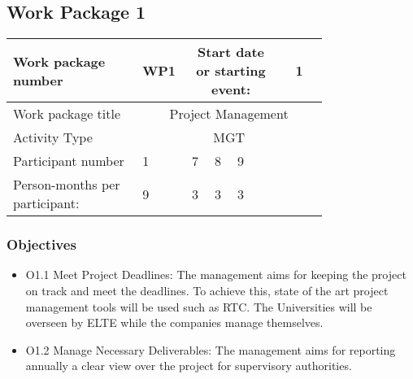 \subsection{Work Package 1}

\begin{table}[hbpt]\centering
	\begin{tabular}{|p{0.35\linewidth}|p{0.06\linewidth}|p{0.06\linewidth}|p{0.06\linewidth}|
                     p{0.06\linewidth}|p{0.06\linewidth}|p{0.06\linewidth}|p{0.06\linewidth}|}\hline
		 Work package number& WP1 &
		 \multicolumn{4}{|c|}{Start date or starting event:}{}&
		 \multicolumn{2}{|c|}{                        1  }{}\\\hline
		 Work package title&\multicolumn{7}{|c|}{ Project Management }{}\\\hline
		 Activity Type&\multicolumn{7}{|c|}{ MGT }{}\\\hline
		 Participant number & 1 & 7 & 8 & 9 & ~ & ~ & ~ \\\hline
		 Person-months per participant: & 9 & 3 & 3 & 3 & ~ & ~ & ~ \\\hline
	\end{tabular}
\end{table}

\subsubsection{Objectives}
\begin{itemize}
	\item O1.1 Meet Project Deadlines: The management aims for keeping the project on track and meet the deadlines. To achieve this, state of the art project management tools will be used such as \gls{RTC}. The Universities will be overseen by ELTE while the companies manage themselves. 
	
	\item O1.2 Manage Necessary Deliverables: The management aims for reporting annually a clear view over the project for supervisory authorities.  
\end{itemize}

